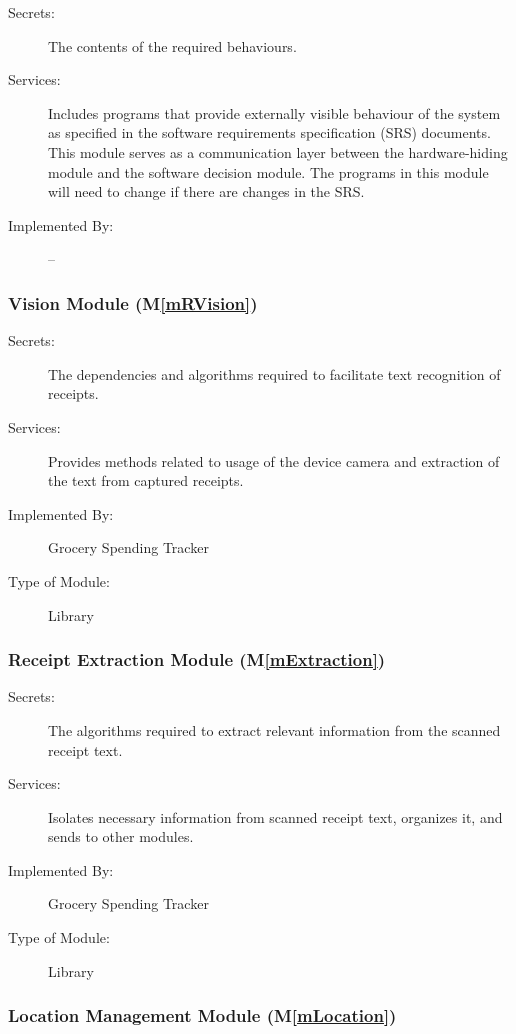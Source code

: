 \documentclass[12pt, titlepage]{article}
\newcommand{\mref}[1]{M\ref{#1}}
\begin{document}
\begin{description}
\item[Secrets:]The contents of the required behaviours.
\item[Services:]Includes programs that provide externally visible behaviour of
  the system as specified in the software requirements specification (SRS)
  documents. This module serves as a communication layer between the
  hardware-hiding module and the software decision module. The programs in this
  module will need to change if there are changes in the SRS.
\item[Implemented By:] --
\end{description}

\subsubsection{Vision Module (\mref{mRVision})}

\begin{description}
\item[Secrets:] The dependencies and algorithms required to facilitate text recognition of receipts.
\item[Services:] Provides methods related to usage of the device camera and extraction of the text from captured
receipts.
\item[Implemented By:] Grocery Spending Tracker
\item[Type of Module:] Library
\end{description}

\subsubsection{Receipt Extraction Module (\mref{mExtraction})}

\begin{description}
\item[Secrets:] The algorithms required to extract relevant information from the scanned receipt text.
\item[Services:] Isolates necessary information from scanned receipt text, organizes it, and sends to other
modules.
\item[Implemented By:] Grocery Spending Tracker
\item[Type of Module:] Library
\end{description}

\subsubsection{Location Management Module (\mref{mLocation})}
\end{document}
